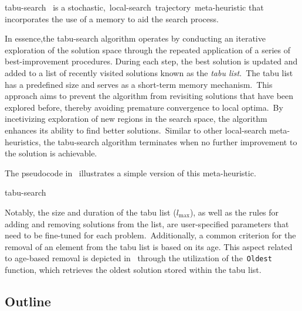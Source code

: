 \acrfull{tabu-search}~\cite{glover1999tabu,gendreau2010tabua,luke2013essentialsa}
is a stochastic,~\acrshort{local-search}~trajectory~\acrshort{meta-heuristic}
that incorporates the use of a memory to aid the search process.

In essence,the \acrshort{tabu-search} algorithm operates by conducting an
iterative exploration of the solution space through the repeated application of
a series of \acrshort{best-improvement} procedures. During each step, the best
solution is updated and added to a list of recently visited solutions known as
the \emph{tabu list}.~The tabu list has a predefined size and serves as a
short-term memory mechanism.~This approach aims to prevent the algorithm from
revisiting solutions that have been explored before, thereby avoiding premature
convergence to local optima.~By incetivizing exploration of new regions in the
search space, the algorithm enhances its ability to find better
solutions.~Similar to other \acrshort{local-search} meta-heuristics, the
\acrfull{tabu-search} algorithm terminates when no further improvement to the
solution is achievable.

The pseudocode in~ illustrates a simple version of
this meta-heuristic.

\begin{algorithm}
  
  \caption{\acrlong{tabu-search}}
  \label{algorithm:tabu-search}
\end{algorithm}

Notably, the size and duration of the tabu list ($l_{\max}$), as well as the
rules for adding and removing solutions from the list, are user-specified
parameters that need to be fine-tuned for each problem.~Additionally, a
common criterion for the removal of an element from the tabu list is based on
its age. This aspect related to age-based removal is depicted
in~ through the utilization of the~\texttt{Oldest}
function, which retrieves the oldest solution stored within the tabu list.

\subsection{Outline}
\label{subsec:Outline}